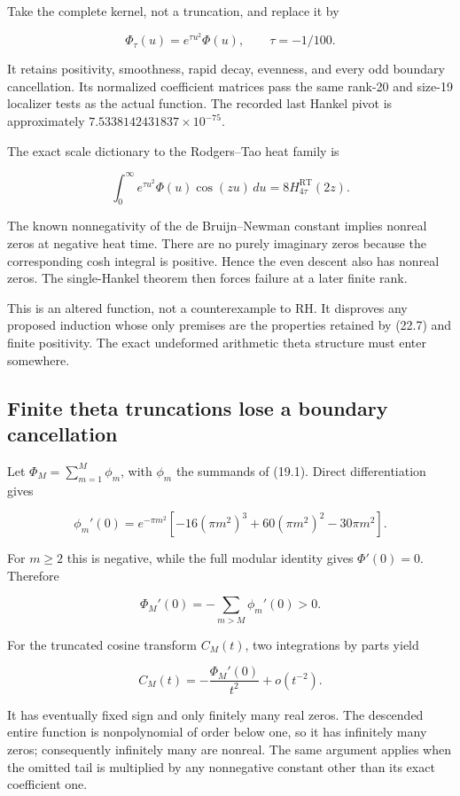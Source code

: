 \documentclass[
  10pt,
  a4paper,
  10pt,
  oneside,
  openany]{book}
\begin{document}
Take the complete kernel, not a truncation, and replace it by

\[
\Phi_\tau(u)=e^{\tau u^2}\Phi(u),\qquad\tau=-1/100.
\tag{22.7}\label{eq:22.7}
\]

It retains positivity, smoothness, rapid decay, evenness, and every odd
boundary cancellation. Its normalized coefficient matrices pass the same
rank-20 and size-19 localizer tests as the actual function. The recorded
last Hankel pivot is approximately \(7.5338142431837\times10^{-75}\).

The exact scale dictionary to the Rodgers--Tao heat family is

\[
\int_0^\infty e^{\tau u^2}\Phi(u)\cos(zu)\,du
=8H_{4\tau}^{\mathrm{RT}}(2z).
\tag{22.8}\label{eq:22.8}
\]

The known nonnegativity of the de Bruijn--Newman constant implies
nonreal zeros at negative heat time. There are no purely imaginary zeros
because the corresponding cosh integral is positive. Hence the even
descent also has nonreal zeros. The single-Hankel theorem then forces
failure at a later finite rank.

This is an altered function, not a counterexample to RH. It disproves
any proposed induction whose only premises are the properties retained
by (22.7) and finite positivity. The exact undeformed arithmetic theta
structure must enter somewhere.

\subsection{Finite theta truncations lose a boundary
cancellation}\label{finite-theta-truncations-lose-a-boundary-cancellation}

Let \(\Phi_M=\sum_{m=1}^M\phi_m\), with \(\phi_m\) the summands of
(19.1). Direct differentiation gives

\[
\phi_m'(0)=e^{-\pi m^2}
[-16(\pi m^2)^3+60(\pi m^2)^2-30\pi m^2].
\tag{22.9}\label{eq:22.9}
\]

For \(m\ge2\) this is negative, while the full modular identity gives
\(\Phi'(0)=0\). Therefore

\[
\Phi_M'(0)=-\sum_{m>M}\phi_m'(0)>0.
\tag{22.10}\label{eq:22.10}
\]

For the truncated cosine transform \(C_M(t)\), two integrations by parts
yield

\[
C_M(t)=-\frac{\Phi_M'(0)}{t^2}+o(t^{-2}).
\tag{22.11}\label{eq:22.11}
\]

It has eventually fixed sign and only finitely many real zeros. The
descended entire function is nonpolynomial of order below one, so it has
infinitely many zeros; consequently infinitely many are nonreal. The
same argument applies when the omitted tail is multiplied by any
nonnegative constant other than its exact coefficient one.
\end{document}
